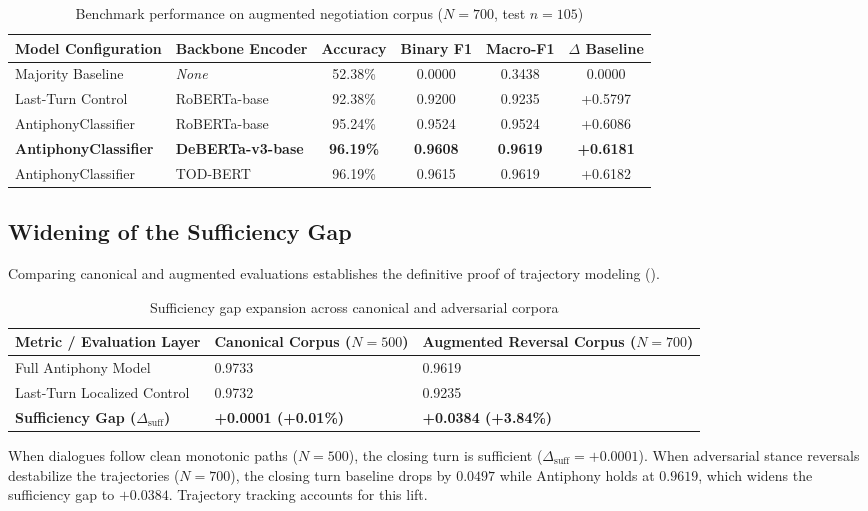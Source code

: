 \begin{table}[htbp]
  \centering
  \small
  \caption{Benchmark performance on augmented negotiation corpus ($N=700$, test $n=105$)}
  \label{tab:transfer-benchmark}
  \begin{tabularx}{\textwidth}{llcccc}
    \toprule
    \textbf{Model Configuration} & \textbf{Backbone Encoder} & \textbf{Accuracy} & \textbf{Binary F1} & \textbf{Macro-F1} & \textbf{$\Delta$ Baseline} \\
    \midrule
    Majority Baseline & \textit{None} & 52.38\% & 0.0000 & 0.3438 & 0.0000 \\
    \rowcolor{lightbg}
    Last-Turn Control & RoBERTa-base & 92.38\% & 0.9200 & 0.9235 & +0.5797 \\
    AntiphonyClassifier & RoBERTa-base & 95.24\% & 0.9524 & 0.9524 & +0.6086 \\
    \rowcolor{lightbg}
    \textbf{AntiphonyClassifier} & \textbf{DeBERTa-v3-base} & \textbf{96.19\%} & \textbf{0.9608} & \textbf{0.9619} & \textbf{+0.6181} \\
    AntiphonyClassifier & TOD-BERT & 96.19\% & 0.9615 & 0.9619 & +0.6182 \\
    \bottomrule
  \end{tabularx}
\end{table}

\subsection{Widening of the Sufficiency Gap}
Comparing canonical and augmented evaluations establishes the definitive proof of trajectory modeling ().

\begin{table}[htbp]
  \centering
  \small
  \caption{Sufficiency gap expansion across canonical and adversarial corpora}
  \label{tab:sufficiency-gap}
  \begin{tabularx}{\textwidth}{lYY}
    \toprule
    \textbf{Metric / Evaluation Layer} & \textbf{Canonical Corpus ($N=500$)} & \textbf{Augmented Reversal Corpus ($N=700$)} \\
    \midrule
    Full Antiphony Model & 0.9733 & 0.9619 \\
    Last-Turn Localized Control & 0.9732 & 0.9235 \\
    \midrule
    \textbf{Sufficiency Gap ($\Delta_{\text{suff}}$)} & \textbf{+0.0001 (+0.01\%)} & \textbf{+0.0384 (+3.84\%)} \\
    \bottomrule
  \end{tabularx}
\end{table}
When dialogues follow clean monotonic paths ($N=500$), the closing turn is sufficient ($\Delta_{\text{suff}} = +0.0001$). When adversarial stance reversals destabilize the trajectories ($N=700$), the closing turn baseline drops by $0.0497$ while Antiphony holds at $0.9619$, which widens the sufficiency gap to \textbf{$+0.0384$}. Trajectory tracking accounts for this lift.

